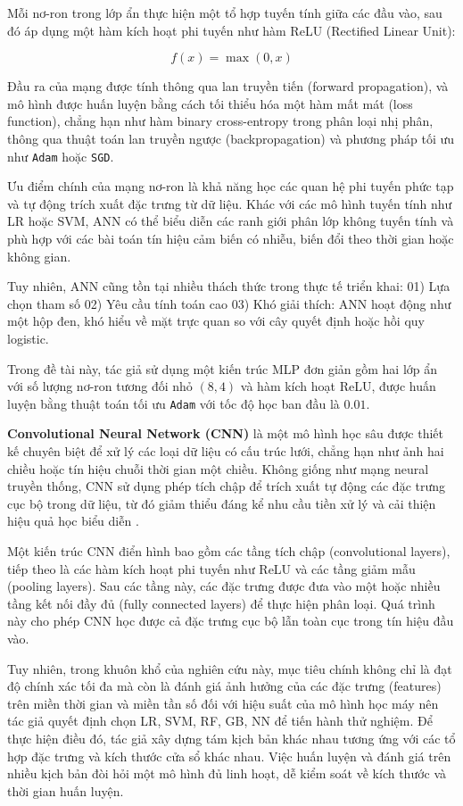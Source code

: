 Mỗi nơ-ron trong lớp ẩn thực hiện một tổ hợp tuyến tính giữa các đầu vào, 
sau đó áp dụng một hàm kích hoạt phi tuyến như hàm ReLU 
(Rectified Linear Unit):

\begin{equation}
    f(x) = \max(0, x)
\end{equation}

Đầu ra của mạng được tính thông qua lan truyền tiến (forward propagation), 
và mô hình được huấn luyện bằng cách tối thiểu hóa một hàm mất mát 
(loss function), chẳng hạn như hàm binary cross-entropy trong phân 
loại nhị phân, thông qua thuật toán lan truyền ngược (backpropagation) và 
phương pháp tối ưu như \texttt{Adam} hoặc \texttt{SGD}.

Ưu điểm chính của mạng nơ-ron là khả năng học các quan hệ phi tuyến 
phức tạp và tự động trích xuất đặc trưng từ dữ liệu. Khác với các mô 
hình tuyến tính như LR hoặc SVM, ANN có thể biểu diễn các ranh giới 
phân lớp không tuyến tính và phù hợp với các bài toán tín hiệu cảm 
biến có nhiễu, biến đổi theo thời gian hoặc không gian.

Tuy nhiên, ANN cũng tồn tại nhiều thách thức trong thực tế triển khai:
01) Lựa chọn tham số
02) Yêu cầu tính toán cao
03) Khó giải thích: ANN hoạt động như một hộp đen, 
khó hiểu về mặt trực quan so với cây quyết định hoặc hồi quy logistic.

Trong đề tài này, tác giả sử dụng một kiến trúc MLP đơn giản gồm hai lớp ẩn với 
số lượng nơ-ron tương đối nhỏ $(8, 4)$ và hàm kích hoạt ReLU, 
được huấn luyện bằng thuật toán tối ưu \texttt{Adam} với 
tốc độ học ban đầu là $0.01$.


\textbf{Convolutional Neural Network (CNN)} là một mô hình học sâu được 
thiết kế chuyên biệt để xử lý các loại dữ liệu có cấu trúc lưới, 
chẳng hạn như ảnh hai chiều hoặc tín hiệu chuỗi thời gian một chiều. 
Không giống như mạng neural truyền thống, CNN sử dụng phép tích chập 
để trích xuất tự động các đặc trưng cục bộ trong dữ liệu, từ đó giảm 
thiểu đáng kể nhu cầu tiền xử lý và cải thiện hiệu quả học biểu diễn 
\cite{lecun2015deep}.


Một kiến trúc CNN điển hình bao gồm các tầng tích chập 
(convolutional layers), tiếp theo là các hàm kích hoạt phi tuyến như 
ReLU và các tầng giảm mẫu (pooling layers). Sau các tầng này, các 
đặc trưng được đưa vào một hoặc nhiều tầng kết nối đầy đủ 
(fully connected layers) để thực hiện phân loại. 
Quá trình này cho phép CNN học được cả đặc trưng cục bộ lẫn 
toàn cục trong tín hiệu đầu vào.

Tuy nhiên, trong khuôn khổ của nghiên cứu này, mục tiêu chính không chỉ 
là đạt độ chính xác tối đa mà còn là đánh giá ảnh hưởng của các 
đặc trưng (features) trên miền thời gian và miền tần số đối với 
hiệu suất của mô hình học máy nên tác giả quyết định chọn LR, SVM, RF, GB, NN để tiến hành thử nghiệm. 
Để thực hiện điều đó, tác giả xây dựng 
tám kịch bản khác nhau tương ứng với các tổ hợp đặc trưng và 
kích thước cửa sổ khác nhau. Việc huấn luyện và đánh giá trên nhiều 
kịch bản đòi hỏi một mô hình đủ linh hoạt, dễ kiểm soát về kích thước 
và thời gian huấn luyện.




